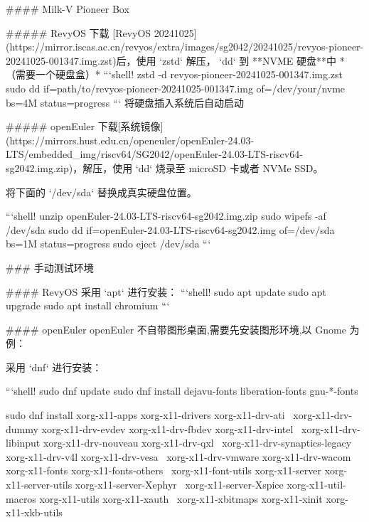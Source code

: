 \documentclass{article}
\begin{document}
\begin{markdown}
#### Milk-V Pioneer Box

##### RevyOS
下载 [RevyOS 20241025](https://mirror.iscas.ac.cn/revyos/extra/images/sg2042/20241025/revyos-pioneer-20241025-001347.img.zst)后，使用 `zstd` 解压， `dd` 到 **NVME 硬盘**中 *（需要一个硬盘盒）*
```shell!
zstd -d revyos-pioneer-20241025-001347.img.zst
sudo dd if=path/to/revyos-pioneer-20241025-001347.img of=/dev/your/nvme bs=4M status=progress
```
将硬盘插入系统后自动启动

##### openEuler
下载[系统镜像](https://mirrors.hust.edu.cn/openeuler/openEuler-24.03-LTS/embedded_img/riscv64/SG2042/openEuler-24.03-LTS-riscv64-sg2042.img.zip)，解压，使用 `dd` 烧录至 microSD 卡或者 NVMe SSD。

将下面的 `/dev/sda` 替换成真实硬盘位置。

```shell!
unzip openEuler-24.03-LTS-riscv64-sg2042.img.zip
sudo wipefs -af /dev/sda
sudo dd if=openEuler-24.03-LTS-riscv64-sg2042.img of=/dev/sda bs=1M status=progress
sudo eject /dev/sda
```

### 手动测试环境

#### RevyOS
采用 `apt` 进行安装：
```shell!
sudo apt update
sudo apt upgrade
sudo apt install chromium
```

#### openEuler
openEuler 不自带图形桌面,需要先安装图形环境,以 Gnome 为例：

采用 `dnf` 进行安装：

```shell!
sudo dnf update
sudo dnf install dejavu-fonts liberation-fonts gnu-*-fonts

sudo dnf install xorg-x11-apps xorg-x11-drivers xorg-x11-drv-ati \
 xorg-x11-drv-dummy xorg-x11-drv-evdev xorg-x11-drv-fbdev xorg-x11-drv-intel \
 xorg-x11-drv-libinput xorg-x11-drv-nouveau xorg-x11-drv-qxl \
 xorg-x11-drv-synaptics-legacy xorg-x11-drv-v4l xorg-x11-drv-vesa \
 xorg-x11-drv-vmware xorg-x11-drv-wacom xorg-x11-fonts xorg-x11-fonts-others \
 xorg-x11-font-utils xorg-x11-server xorg-x11-server-utils xorg-x11-server-Xephyr \
 xorg-x11-server-Xspice xorg-x11-util-macros xorg-x11-utils xorg-x11-xauth \
 xorg-x11-xbitmaps xorg-x11-xinit xorg-x11-xkb-utils


\end{markdown}
\end{document}
